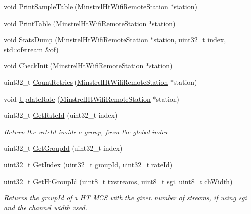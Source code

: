 \begin{DoxyCompactItemize}
void \hyperlink{classns3_1_1MinstrelHtWifiManager_ac4f7bc4281f141466bfe6b01151c41c0}{Print\+Sample\+Table} (\hyperlink{structns3_1_1MinstrelHtWifiRemoteStation}{Minstrel\+Ht\+Wifi\+Remote\+Station} $\ast$station)
\item 
void \hyperlink{classns3_1_1MinstrelHtWifiManager_a434fb6aadb02a74cc097ba54b7b02cb3}{Print\+Table} (\hyperlink{structns3_1_1MinstrelHtWifiRemoteStation}{Minstrel\+Ht\+Wifi\+Remote\+Station} $\ast$station)
\item 
void \hyperlink{classns3_1_1MinstrelHtWifiManager_a11ef14d90291b78f771eec0d1dad712f}{Stats\+Dump} (\hyperlink{structns3_1_1MinstrelHtWifiRemoteStation}{Minstrel\+Ht\+Wifi\+Remote\+Station} $\ast$station, uint32\+\_\+t index, std\+::ofstream \&of)
\item 
void \hyperlink{classns3_1_1MinstrelHtWifiManager_a7f94804a34efa6121bdfd5d01ac34694}{Check\+Init} (\hyperlink{structns3_1_1MinstrelHtWifiRemoteStation}{Minstrel\+Ht\+Wifi\+Remote\+Station} $\ast$station)
\item 
uint32\+\_\+t \hyperlink{classns3_1_1MinstrelHtWifiManager_a049c7b034d4647393f6949467fbcb628}{Count\+Retries} (\hyperlink{structns3_1_1MinstrelHtWifiRemoteStation}{Minstrel\+Ht\+Wifi\+Remote\+Station} $\ast$station)
\item 
void \hyperlink{classns3_1_1MinstrelHtWifiManager_abb282b56803faf26139d0db929b09b22}{Update\+Rate} (\hyperlink{structns3_1_1MinstrelHtWifiRemoteStation}{Minstrel\+Ht\+Wifi\+Remote\+Station} $\ast$station)
\item 
uint32\+\_\+t \hyperlink{classns3_1_1MinstrelHtWifiManager_a6162341f1348bbe713d09642b09ac658}{Get\+Rate\+Id} (uint32\+\_\+t index)
\begin{DoxyCompactList}\small\item\em Return the rate\+Id inside a group, from the global index. \end{DoxyCompactList}\item 
uint32\+\_\+t \hyperlink{classns3_1_1MinstrelHtWifiManager_a43157e6007b4b922043cb02a99ea6d1f}{Get\+Group\+Id} (uint32\+\_\+t index)
\item 
uint32\+\_\+t \hyperlink{classns3_1_1MinstrelHtWifiManager_ac67b182c22710c919c3dd4de337aca79}{Get\+Index} (uint32\+\_\+t group\+Id, uint32\+\_\+t rate\+Id)
\item 
uint32\+\_\+t \hyperlink{classns3_1_1MinstrelHtWifiManager_a44b99858b15826da1b42f135041058e0}{Get\+Ht\+Group\+Id} (uint8\+\_\+t txstreams, uint8\+\_\+t sgi, uint8\+\_\+t ch\+Width)
\begin{DoxyCompactList}\small\item\em Returns the group\+Id of a HT M\+CS with the given number of streams, if using sgi and the channel width used. \end{DoxyCompactList}\item 

\end{DoxyCompactItemize}
